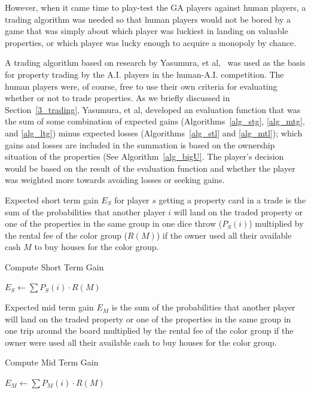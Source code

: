 However, when it came time to play-test the GA players against human players, a
trading algorithm was needed so that human players would not be bored by a game
that was simply about which player was luckiest in landing on valuable
properties, or which player was lucky enough to acquire a monopoly by chance.

A trading algorithm based on research by Yasumura, et
al,~\cite{Yasumura2001Negotiate} was used as the basis for property trading by
the A.I. players in the human-A.I. competition. The human players were, of
course, free to use their own criteria for evaluating whether or not to trade
properties. As we briefly discussed in Section~\ref{3_trading}, Yasumura, et al,
developed an evaluation function that was the sum of some combination of
expected gains (Algorithms~\ref{alg_stg}, \ref{alg_mtg}, and \ref{alg_ltg})
minus expected losses (Algorithms~\ref{alg_stl} and \ref{alg_mtl}); which gains
and losses are included in the summation is based on the ownership situation of
the properties (See Algorithm~\ref{alg_bigU}. The player's decision would be
based on the result of the evaluation function and whether the player was
weighted more towards avoiding losses or seeking gains.

Expected short term gain \(E_S\) for player \(s\) getting a property card in a
trade is the sum of the probabilities that another player \(i\) will land on the
traded property or one of the properties in the same group in one dice throw
(\(P_S(i)\)) multiplied by the rental fee of the color group (\(R(M)\)) if the
owner used all their available cash \(M\) to buy houses for the color group.
\begin{algorithm} 
\caption{Compute Short Term Gain}
\label{alg_stg}
\begin{algorithmic}
   \STATE $E_S \gets \sum P_S(i) \cdot R(M)$ 
\end{algorithmic}
\end{algorithm}

Expected mid term gain \(E_M\) is the sum of the probabilities that another
player will land on the traded property or one of the properties in the same group in
one trip around the board multiplied by the rental fee of the color group if the
owner were used all their available cash to buy houses for the color group.
\begin{algorithm} 
\caption{Compute Mid Term Gain}
\label{alg_mtg}
\begin{algorithmic}
   \STATE $E_M \gets \sum P_M(i) \cdot R(M)$ 
\end{algorithmic}
\end{algorithm}

